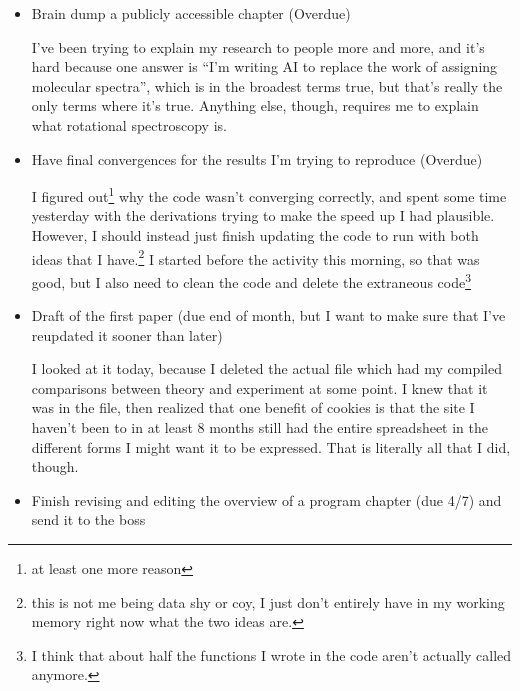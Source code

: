\documentclass[12pt]{article}[titlepage]
\newcommand{\say}[1]{``#1''}
\renewcommand{\,}{\textsuperscript{,}}
\begin{document}
\begin{itemize}
\begin{itemize}
\begin{itemize}
On the bright side, I had the event today, so I can at least write about how it went in the form of a laboratory report.  
It's almost certainly not worth publishing, but that's why it gets to go in the thesis.  
If I start reading the books on teaching astronomy and chemistry that I have in my shelf, I can write something about that, if only as a \say{this could be a cool experiment for someone to use}  
\item Brain dump a publicly accessible chapter (Overdue)  
  
I've been trying to explain my research to people more and more, and it's hard because one answer is \say{I'm writing AI to replace the work of assigning molecular spectra}, which is in the broadest terms true, but that's really the only terms where it's true.  
Anything else, though, requires me to explain what rotational spectroscopy is.  
\item Have final convergences for the results I'm trying to reproduce (Overdue)

I figured out\footnote{at least one more reason} why the code wasn't converging correctly, and spent some time yesterday with the derivations trying to make the speed up I had plausible.  
However, I should instead just finish updating the code to run with both ideas that I have.\footnote{this is not me being data shy or coy, I just don't entirely have in my working memory right now what the two ideas are.}  
I started before the activity this morning, so that was good, but I also need to clean the code and delete the extraneous code\footnote{I think that about half the functions I wrote in the code aren't actually called anymore.}  
\item Draft of the first paper (due end of month, but I want to make sure that I've reupdated it sooner than later)  
  
I looked at it today, because I deleted the actual file which had my compiled comparisons between theory and experiment at some point.  
I knew that it was in the file, then realized that one benefit of cookies is that the site I haven't been to in at least 8 months still had the entire spreadsheet in the different forms I might want it to be expressed.  
That is literally all that I did, though.  
\item Finish revising and editing the overview of a program chapter (due 4/7) and send it to the boss


\end{itemize}
\end{itemize}
\end{itemize}
\end{document}
